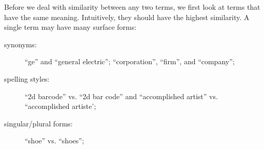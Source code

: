 %
%

Before we deal with similarity between any two terms, we first look at
terms that have the same meaning. Intuitively, they should have the
highest similarity.  A single term may have many surface forms:
\begin{description}
\item[synonyms:] ``ge'' and ``general electric''; ``corporation'', ``firm'', and ``company'';
\item[spelling styles:] ``2d barcode'' vs. ``2d bar code'' and  ``accomplished artist'' vs.
``accomplished artiste';
\item[singular/plural forms:] ``shoe'' vs. ``shoes'';
\end{description}

